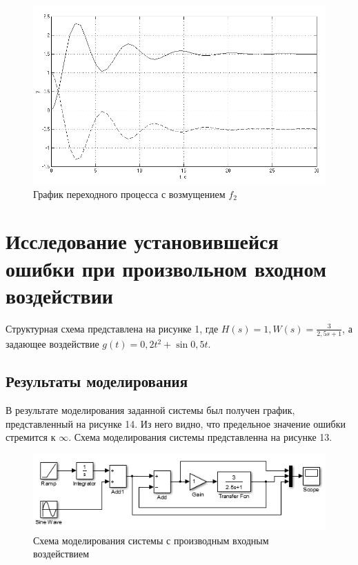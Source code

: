 \documentclass[a4paper, 11pt, russian]{article}
\begin{document}
    \begin{figure}[ht!]
        \centering
        \includegraphics[scale = 0.7]{disturbance2.png}
        \caption{График переходного процесса с возмущением $f_2$}
    \end{figure}
    
    \section{Исследование установившейся ошибки при произвольном входном воздействии}
    Структурная схема представлена на рисунке 1, где $H(s) = 1, W(s) = \displaystyle{\frac{3}{2,5s + 1}}$, а задающее воздействие $g(t) = 0,2t^2 + \sin{0,5t}$.
    \subsection{Результаты моделирования}
    В результате моделирования заданной системы был получен график, представленный на рисунке 14. Из него видно, что предельное значение ошибки стремится к $\infty$. Схема моделирования системы представленна на рисунке 13.
    \begin{figure}[h!]
        \centering
        \includegraphics[scale = 1]{customSourceScheme.PNG}
        \caption{Схема моделирования системы с производным входным воздействием}
    \end{figure}
    
\end{document}
